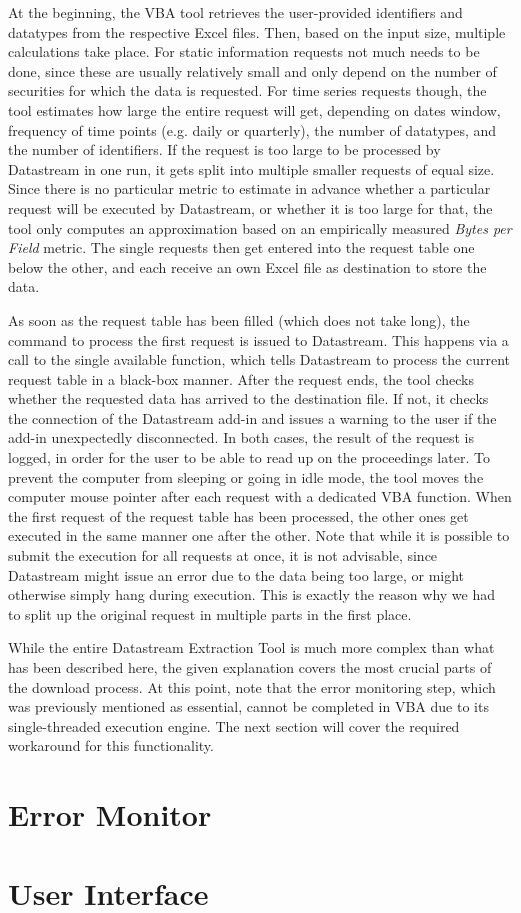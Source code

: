 At the beginning, the VBA tool retrieves the user-provided identifiers and datatypes from the respective Excel files. Then, based on the input size, multiple calculations take place. For static information requests not much needs to be done, since these are usually relatively small and only depend on the number of securities for which the data is requested. For time series requests though, the tool estimates how large the entire request will get, depending on dates window, frequency of time points (e.g. daily or quarterly), the number of datatypes, and the number of identifiers. If the request is too large to be processed by Datastream in one run, it gets split into multiple smaller requests of equal size. Since there is no particular metric to estimate in advance whether a particular request will be executed by Datastream, or whether it is too large for that, the tool only computes an approximation based on an empirically measured \textit{Bytes per Field} metric. The single requests then get entered into the request table one below the other, and each receive an own Excel file as destination to store the data. 

As soon as the request table has been filled (which does not take long), the command to process the first request is issued to Datastream. This happens via a call to the single available function, which tells Datastream to process the current request table in a black-box manner. After the request ends, the tool checks whether the requested data has arrived to the destination file. If not, it checks the connection of the Datastream add-in and issues a warning to the user if the add-in unexpectedly disconnected. In both cases, the result of the request is logged, in order for the user to be able to read up on the proceedings later. To prevent the computer from sleeping or going in idle mode, the tool moves the computer mouse pointer after each request with a dedicated VBA function. When the first request of the request table has been processed, the other ones get executed in the same manner one after the other. Note that while it is possible to submit the execution for all requests at once, it is not advisable, since Datastream might issue an error due to the data being too large, or might otherwise simply hang during execution. This is exactly the reason why we had to split up the original request in multiple parts in the first place. 

While the entire Datastream Extraction Tool is much more complex than what has been described here, the given explanation covers the most crucial parts of the download process. At this point, note that the error monitoring step, which was previously mentioned as essential, cannot be completed in VBA due to its single-threaded execution engine. The next section will cover the required workaround for this functionality. 

\section{Error Monitor}


\section{User Interface}



